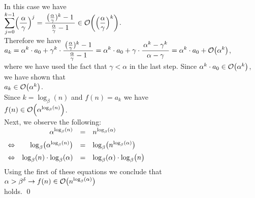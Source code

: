 \begin{enumerate}
      In this case we have
      \\[0.2cm]
      \hspace*{1.3cm}
      $\ds\sum\limits_{j=0}^{k-1} \Bigl(\frac{\,\alpha\,}{\gamma}\Bigr)^j = \bruch{\bigl(\frac{\alpha}{\gamma})^k - 1}{\frac{\alpha}{\gamma} - 1} \in \Oh\biggl(\Bigl(\frac{\alpha}{\gamma}\Bigr)^k\biggr)$.
      \\[0.2cm]
      Therefore we have
      \\[0.2cm]
      \hspace*{1.3cm}
      $\ds a_k = \alpha^k\cdot a_0 + \gamma^k \cdot \bruch{\bigl(\frac{\alpha}{\gamma})^k - 1}{\frac{\alpha}{\gamma} - 1} =
                   \alpha^k\cdot a_0 + \gamma \cdot \bruch{\alpha^k -\gamma^k}{\alpha - \gamma} =
                   \alpha^k\cdot a_0 + \Oh\bigl(\alpha^k\bigr)
      $,
      \\[0.2cm] 
      where we have used the fact that $\gamma < \alpha$ in the last step.
      Since $\alpha^k \cdot a_0 \in \mathcal{O}\bigl(\alpha^k\bigr)$, we have shown that
      \\[0.2cm]
      \hspace*{1.3cm}
      $a_k \in  \mathcal{O}\bigl(\alpha^k\bigr)$.
      \\[0.2cm]
      Since  $k = \log_{\beta}(n)$ and $f(n) = a_k$ we have
      \\[0.2cm]
      \hspace*{1.3cm}
      $f(n) \in \mathcal{O}\Bigl(\alpha^{\log_{\beta}(n)}\Bigr)$.
      \\[0.2cm] 
      Next, we observe the following:
      \\[0.2cm]
      \hspace*{1.3cm}
      $
      \begin{array}[t]{lrcl}
                        & \displaystyle\alpha^{\log_{\beta}(n)} & = & n^{\log_{\beta}(\alpha)} \\[0.2cm]
        \Leftrightarrow & \log_\beta\bigl(\alpha^{\log_{\beta}(n)}\bigr) & = & \log_{\beta}\bigl(n^{\log_{\beta}(\alpha)}\bigr) \\[0.2cm]
        \Leftrightarrow & \log_{\beta}(n) \cdot \log_\beta(\alpha) & = & \log_{\beta}(\alpha) \cdot \log_{\beta}\bigl(n\bigr) \\[0.2cm]      
      \end{array}
      $
      \\[0.2cm]
      Using the first of these equations we conclude that
      \\[0.2cm]
      \hspace*{1.3cm}
      $\alpha > \beta^\delta \rightarrow f(n) \in \mathcal{O}\bigl(n^{\log_{\beta}(\alpha)}\bigr)$
      \\[0.2cm]
      holds.  \qed
\end{enumerate}

